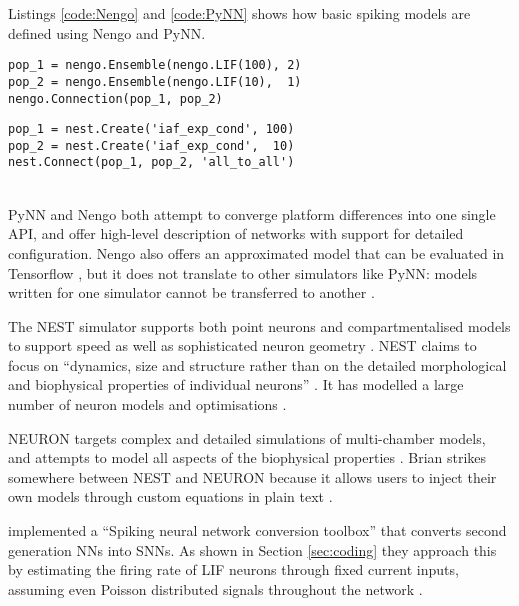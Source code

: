 \documentclass[report.tex]{subfiles}
\begin{document}
Listings \ref{code:Nengo} and \ref{code:PyNN} shows how
basic spiking models are defined using Nengo and PyNN.

\begin{minipage}{\linewidth}
\begin{lstlisting}
pop_1 = nengo.Ensemble(nengo.LIF(100), 2)
pop_2 = nengo.Ensemble(nengo.LIF(10),  1)
nengo.Connection(pop_1, pop_2)
\end{lstlisting}
\end{minipage}

\begin{minipage}{\linewidth}
\begin{lstlisting}
pop_1 = nest.Create('iaf_exp_cond', 100)
pop_2 = nest.Create('iaf_exp_cond',  10)
nest.Connect(pop_1, pop_2, 'all_to_all')
\end{lstlisting} 
\end{minipage}
\\[0.3cm]
PyNN and Nengo both attempt to converge platform differences into one single \gls{API}, and
offer high-level description of networks with support for detailed 
configuration.
Nengo also offers an approximated model that can be evaluated in Tensorflow
\cite{Hunsberger2015}, but it does not translate to other simulators like PyNN:
models written for one simulator cannot be transferred to another \cite{Nengo2018}.

The NEST simulator supports both point neurons 
and compartmentalised models to support speed as well as sophisticated neuron
geometry \cite{Gewaltig2007}.
NEST claims to focus on ``dynamics, size and structure rather than on the detailed
morphological and biophysical properties of individual neurons''
\cite{Gewaltig2007}.
It has modelled a large number of neuron models and optimisations
\cite{Blundell2018}.

NEURON targets complex and detailed simulations of multi-chamber models, and
attempts to model all aspects of the biophysical properties \cite{Carnevale2007}.
Brian strikes somewhere between NEST and NEURON because it allows users to
inject their own models through custom equations in plain text \cite{Goodman2013}.

\textcite{Rueckauer2017} implemented a ``Spiking neural network conversion
toolbox'' that converts second generation \glspl{NN} into \glspl{SNN}.
As shown in Section \ref{sec:coding} they approach this by estimating the 
firing rate of LIF  neurons through fixed current inputs,
assuming even Poisson distributed signals
throughout the network \cite{Rueckauer2017}.
\end{document}

